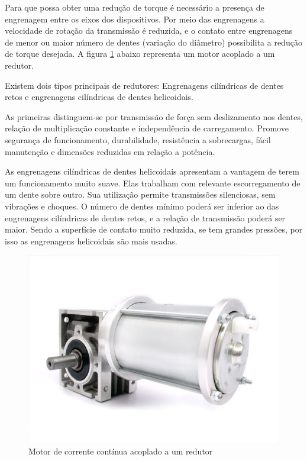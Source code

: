 Para que possa obter uma redução de torque é necessário a presença de engrenagem entre os eixos dos dispositivos. Por meio das engrenagens a velocidade de rotação da transmissão é reduzida, e o contato entre engrenagens de menor ou maior número de dentes (variação do diâmetro) possibilita a redução de torque desejada. A figura \ref{fig:motor} abaixo representa um motor acoplado a um redutor.


Existem dois tipos principais de redutores: Engrenagens cilíndricas de dentes retos e engrenagens cilíndricas de dentes helicoidais.

As primeiras distinguem-se por transmissão de força sem deslizamento nos dentes, relação de multiplicação constante e independência de carregamento. Promove segurança de funcionamento, durabilidade, resistência a sobrecargas, fácil manutenção e dimensões reduzidas em relação a potência.

As engrenagens cilíndricas de dentes helicoidais apresentam a vantagem de terem um funcionamento muito suave. Elas trabalham com relevante escorregamento de um dente sobre outro. Sua utilização permite transmissões silenciosas, sem vibrações e choques. O número de dentes mínimo poderá ser inferior ao das engrenagens cilíndricas de dentes retos, e a relação de transmissão poderá ser maior. Sendo a superfície de contato muito reduzida, se tem grandes pressões, por isso as engrenagens helicoidais são mais usadas.

\begin{figure}[!htb]
	\centering
	\includegraphics[keepaspectratio=true,scale=0.5]{figuras/referencialteorico/motor}
	\caption{Motor de corrente contínua acoplado a um redutor}
	\label{fig:motor}
\end{figure}

